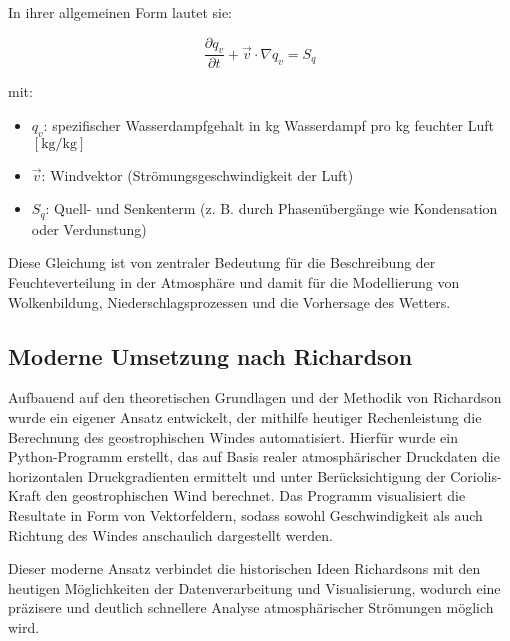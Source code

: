 In ihrer allgemeinen Form lautet sie:

\begin{equation}
\frac{\partial q_v}{\partial t} + \vec{v} \cdot \nabla q_v = S_q
\tag{19.10}
\end{equation}

mit:  
\begin{itemize}
    \item $q_v$: spezifischer Wasserdampfgehalt in kg Wasserdampf pro kg feuchter Luft $[\mathrm{kg/kg}]$
    \item $\vec{v}$: Windvektor (Strömungsgeschwindigkeit der Luft)
    \item $S_q$: Quell- und Senkenterm (z. B. durch Phasenübergänge wie Kondensation oder Verdunstung)
\end{itemize}

Diese Gleichung ist von zentraler Bedeutung für die Beschreibung der Feuchteverteilung in der Atmosphäre und damit für die Modellierung von Wolkenbildung, Niederschlagsprozessen und die Vorhersage des Wetters.


\subsection{Moderne Umsetzung nach Richardson} 

Aufbauend auf den theoretischen Grundlagen und der Methodik von Richardson wurde ein eigener Ansatz entwickelt, der mithilfe heutiger Rechenleistung die Berechnung des geostrophischen Windes automatisiert.
Hierfür wurde ein Python-Programm erstellt, das auf Basis realer atmosphärischer Druckdaten die horizontalen Druckgradienten ermittelt und unter Berücksichtigung der Coriolis-Kraft den geostrophischen Wind berechnet.
Das Programm visualisiert die Resultate in Form von Vektorfeldern, sodass sowohl Geschwindigkeit als auch Richtung des Windes anschaulich dargestellt werden.

Dieser moderne Ansatz verbindet die historischen Ideen Richardsons mit den heutigen Möglichkeiten der Datenverarbeitung und Visualisierung, wodurch eine präzisere und deutlich schnellere Analyse atmosphärischer Strömungen möglich wird.

